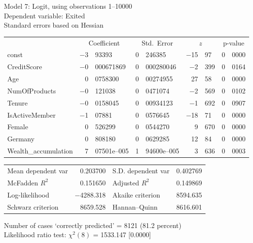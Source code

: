\documentclass[11pt]{article}
\begin{document}
\thispagestyle{empty}

\begin{center}

Model 7: Logit, using observations 1--10000\\
Dependent variable: Exited\\
Standard errors based on Hessian

\vspace{1em}

\begin{tabular}{lr@{.}lr@{.}lr@{.}lr@{.}l}
  &
 \multicolumn{2}{c}{Coefficient} &
  \multicolumn{2}{c}{Std.\ Error} &
   \multicolumn{2}{c}{$z$} &
    \multicolumn{2}{c}{p-value} \\[1ex]
const &
  $-$3&93393 &
    0&246385 &
      $-$15&97 &
        0&0000 \\
CreditScore &
  $-$0&000671869 &
    0&000280046 &
      $-$2&399 &
        0&0164 \\
Age &
  0&0758300 &
    0&00274955 &
      27&58 &
        0&0000 \\
NumOfProducts &
  $-$0&121038 &
    0&0471074 &
      $-$2&569 &
        0&0102 \\
Tenure &
  $-$0&0158045 &
    0&00934123 &
      $-$1&692 &
        0&0907 \\
IsActiveMember &
  $-$1&07881 &
    0&0576645 &
      $-$18&71 &
        0&0000 \\
Female &
  0&526299 &
    0&0544270 &
      9&670 &
        0&0000 \\
Germany &
  0&808180 &
    0&0629285 &
      12&84 &
        0&0000 \\
Wealth\_accumulation &
  7&07501\textrm{e--005} &
    1&94600\textrm{e--005} &
      3&636 &
        0&0003 \\
\end{tabular}

\vspace{1ex}
\begin{tabular}{lrlr}
Mean dependent var &  0.203700 & S.D. dependent var &  0.402769 \\
McFadden $R^2$ &  0.151650 & Adjusted $R^2$ &  0.149869 \\
Log-likelihood & $-$4288.318 & Akaike criterion &  8594.635 \\
Schwarz criterion &  8659.528 & Hannan--Quinn &  8616.601 \\
\end{tabular}


\vspace{1ex}
\vspace{1em}
\begin{raggedright}
Number of cases `correctly predicted' = 8121 (81.2 percent)\\
Likelihood ratio test: $\chi^2(8)$ = 1533.147 [0.0000]\\
\end{raggedright}

\end{center}
\end{document}
